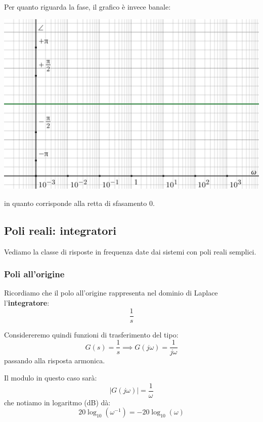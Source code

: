 \documentclass[a4paper,11pt]{article}
\begin{document}
\par\medskip

Per quanto riguarda la fase, il grafico è invece banale:
\begin{center}
	\includegraphics[scale=0.3]{../figures/costant_bode/phase.png}
\end{center}
in quanto corrisponde alla retta di sfasamento 0.

\subsection{Poli reali: integratori}
Vediamo la classe di risposte in frequenza date dai sistemi con poli reali semplici.

\subsubsection{Poli all'origine}
Ricordiamo che il polo all'origine rappresenta nel dominio di Laplace l'\textbf{integratore}:
$$
\frac{1}{s}
$$

Considereremo quindi funzioni di trasferimento del tipo:
$$
G(s) = \frac{1}{s} \implies G(j \omega) = \frac{1}{j\omega}
$$
passando alla risposta armonica.

Il modulo in questo caso sarà:
$$
|G(j\omega)| = \frac{1}{\omega} 
$$
che notiamo in logaritmo (dB) dà:
$$
20 \log_{10} \left( \omega^{-1} \right) = - 20 \log_{10} (\omega)
$$

\par\medskip
\end{document}
